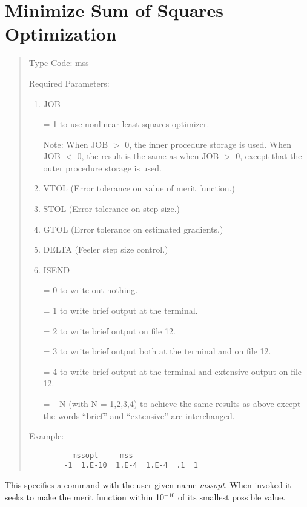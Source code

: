 \newpage
\section{Minimize Sum of Squares Optimization}    
\begin{quotation}
\noindent     Type Code:  mss
\vspace{5mm}

\noindent Required Parameters:
\begin{enumerate}
       \item  JOB

              = 1 to use nonlinear least squares optimizer.

              Note:  When JOB $>$ 0, the inner procedure storage is
used.  When JOB $<$ 0, the result is the same as when JOB $>$ 0, except
that the outer procedure storage is used.

        \item  VTOL (Error tolerance on value of merit function.)

        \item  STOL (Error tolerance on step size.)

        \item  GTOL (Error tolerance on estimated gradients.)

	    \item  DELTA (Feeler step size control.)

       \item  ISEND

              = 0 to write out nothing.

              = 1 to write brief output at the terminal.

              = 2 to write brief output on file 12.

              = 3 to write brief output both at the terminal and on file 12.

              = 4 to write brief output at the terminal and extensive output on file 12.

              = $-$N (with N = 1,2,3,4) to achieve the same results as above except the
               \hspace*{1em}words ``brief'' and ``extensive'' are interchanged.
\end{enumerate}
\vspace{5mm}
\noindent Example:
\begin{verbatim}
          mssopt     mss
        -1  1.E-10  1.E-4  1.E-4  .1  1
\end{verbatim}
\end{quotation}
This specifies a command with the user given name {\em mssopt}.  When invoked it seeks to make the merit function within 10$^{-10}$ of its smallest possible value.

